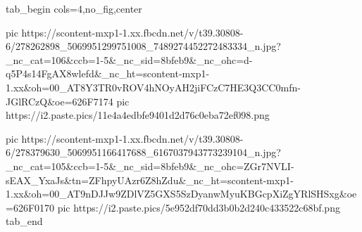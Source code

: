 
 
 
 
 

\ifcmt
  tab_begin cols=4,no_fig,center

     pic https://scontent-mxp1-1.xx.fbcdn.net/v/t39.30808-6/278262898_5069951299751008_7489274452272483334_n.jpg?_nc_cat=106&ccb=1-5&_nc_sid=8bfeb9&_nc_ohc=d-q5P4s14FgAX8wlefd&_nc_ht=scontent-mxp1-1.xx&oh=00_AT8Y3TR0vROV4hNOyAH2jiFCzC7HE3Q3CC0mfn-JGlRCzQ&oe=626F7174
		 pic https://i2.paste.pics/11e4a4edbfe9401d2d76c0eba72ef098.png

     pic https://scontent-mxp1-1.xx.fbcdn.net/v/t39.30808-6/278379630_5069951166417688_6167037943773239104_n.jpg?_nc_cat=105&ccb=1-5&_nc_sid=8bfeb9&_nc_ohc=ZGr7NVLI-sEAX_YxaJs&tn=ZFhpyUAzr6Z8hZdu&_nc_ht=scontent-mxp1-1.xx&oh=00_AT9nDJJw9ZDlVZ5GXS5SzDyanwMyuKBGcpXiZgYRlSHSxg&oe=626F0170
		 pic https://i2.paste.pics/5e952df70dd3b0b2d240c433522c68bf.png
  tab_end
\fi
